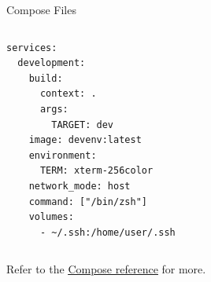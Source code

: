 \begin{frame}[fragile]{Compose Files}
\begin{columns}
\begin{lstlisting}[language=compose, caption=Minimal example of a Compose file]
services:
  development:
    build:
      context: .
      args:
        TARGET: dev
    image: devenv:latest
    environment:
      TERM: xterm-256color
    network_mode: host
    command: ["/bin/zsh"]
    volumes:
      - ~/.ssh:/home/user/.ssh
\end{lstlisting}
\end{columns}
Refer to the \href{https://docs.docker.com/compose/compose-file/}{\color{blue}\underline{Compose reference}} for more.
\end{frame}

